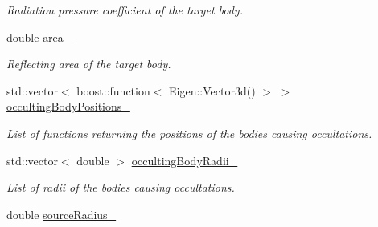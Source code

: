 \begin{DoxyCompactItemize}
\begin{DoxyCompactList}\small\item\em Radiation pressure coefficient of the target body. \end{DoxyCompactList}\item 
double \hyperlink{classtudat_1_1electro__magnetism_1_1RadiationPressureInterface_a67aeeda2137537e69ba14e82b0ae4fbb}{area\+\_\+}\hypertarget{classtudat_1_1electro__magnetism_1_1RadiationPressureInterface_a67aeeda2137537e69ba14e82b0ae4fbb}{}\label{classtudat_1_1electro__magnetism_1_1RadiationPressureInterface_a67aeeda2137537e69ba14e82b0ae4fbb}

\begin{DoxyCompactList}\small\item\em Reflecting area of the target body. \end{DoxyCompactList}\item 
std\+::vector$<$ boost\+::function$<$ Eigen\+::\+Vector3d() $>$ $>$ \hyperlink{classtudat_1_1electro__magnetism_1_1RadiationPressureInterface_acd4e524cf63b57fcd3e115e105fe06bb}{occulting\+Body\+Positions\+\_\+}\hypertarget{classtudat_1_1electro__magnetism_1_1RadiationPressureInterface_acd4e524cf63b57fcd3e115e105fe06bb}{}\label{classtudat_1_1electro__magnetism_1_1RadiationPressureInterface_acd4e524cf63b57fcd3e115e105fe06bb}

\begin{DoxyCompactList}\small\item\em List of functions returning the positions of the bodies causing occultations. \end{DoxyCompactList}\item 
std\+::vector$<$ double $>$ \hyperlink{classtudat_1_1electro__magnetism_1_1RadiationPressureInterface_a425ec6ba68e48fcfd066e5e3e892b5d5}{occulting\+Body\+Radii\+\_\+}\hypertarget{classtudat_1_1electro__magnetism_1_1RadiationPressureInterface_a425ec6ba68e48fcfd066e5e3e892b5d5}{}\label{classtudat_1_1electro__magnetism_1_1RadiationPressureInterface_a425ec6ba68e48fcfd066e5e3e892b5d5}

\begin{DoxyCompactList}\small\item\em List of radii of the bodies causing occultations. \end{DoxyCompactList}\item 
double \hyperlink{classtudat_1_1electro__magnetism_1_1RadiationPressureInterface_a8032468237ddf2bb422bcdd317a58d8d}{source\+Radius\+\_\+}\hypertarget{classtudat_1_1electro__magnetism_1_1RadiationPressureInterface_a8032468237ddf2bb422bcdd317a58d8d}{}\label{classtudat_1_1electro__magnetism_1_1RadiationPressureInterface_a8032468237ddf2bb422bcdd317a58d8d}


\end{DoxyCompactItemize}
